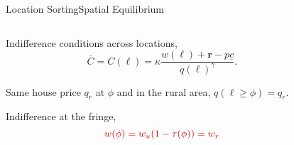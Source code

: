 \documentclass[aspectratio=169]{beamer}
\begin{document}
\begin{v75mins}
\begin{frame}{Location Sorting}{Spatial Equilibrium}
\begin{columns}
\begin{column}{0.5\textwidth}

\begin{midi}
 \item  Indifference conditions across locations,
\begin{equation*}
 \overline{C}=C(\ell)=\kappa\frac{w(\ell)+\mathbf{r}-p\underline{c}}{q(\ell)^{\gamma}}.
\end{equation*}
\item Same house price $q_r$ at $\phi$ and in the rural area, $q(\ell \geq \phi)=q_r$.
\item Indifference at the fringe,
\begin{equation*}
\re{w(\phi)=w_u(1-\tau(\phi))=w_r}
\end{equation*}
\end{midi} 
\end{column}		
\begin{column}{0.5\textwidth}
		
\end{column}
\end{columns}
\pause


\end{frame}




\end{v75mins}
\end{document}
